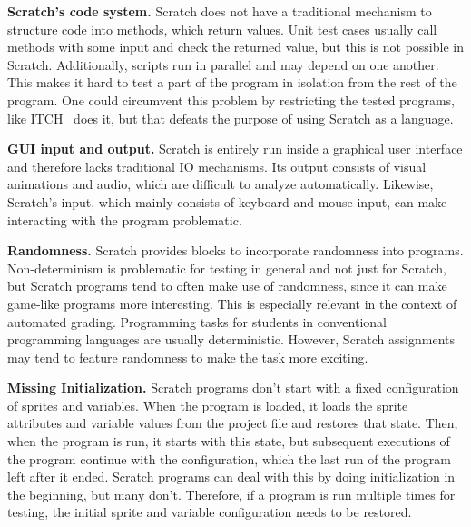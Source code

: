 \textbf{Scratch's code system.}
Scratch does not have a traditional mechanism to structure code into methods, which return values.
Unit test cases usually call methods with some input and check the returned value, but this is not possible in Scratch.
Additionally, scripts run in parallel and may depend on one another.
This makes it hard to test a part of the program in isolation from the rest of the program.
One could circumvent this problem by restricting the tested programs, like ITCH~\cite{itch} does it,
but that defeats the purpose of using Scratch as a language.
\parspace

\textbf{GUI input and output.}
Scratch is entirely run inside a graphical user interface and therefore lacks traditional IO mechanisms.
Its output consists of visual animations and audio, which are difficult to analyze automatically.
Likewise, Scratch's input, which mainly consists of keyboard and mouse input, can make interacting with the program problematic.
\parspace

\textbf{Randomness.}
Scratch provides blocks to incorporate randomness into programs.
Non-determinism is problematic for testing in general and not just for Scratch,
but Scratch programs tend to often make use of randomness,
since it can make game-like programs more interesting.
This is especially relevant in the context of automated grading.
Programming tasks for students in conventional programming languages are usually deterministic.
However, Scratch assignments may tend to feature randomness to make the task more exciting.
\parspace

\textbf{Missing Initialization.}
Scratch programs don't start with a fixed configuration of sprites and variables.
When the program is loaded, it loads the sprite attributes and variable values from the project file and restores that state.
Then, when the program is run, it starts with this state, but subsequent executions of the program continue with the configuration,
which the last run of the program left after it ended.
Scratch programs can deal with this by doing initialization in the beginning, but many don't.
Therefore, if a program is run multiple times for testing, the initial sprite and variable configuration needs to be restored.
\parspace

